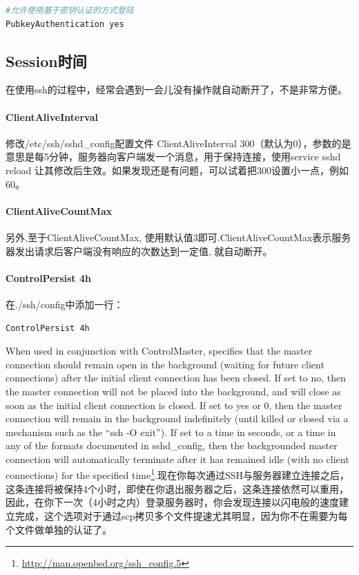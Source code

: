 \documentclass[letter]{book}
\begin{document}
\begin{lstlisting}[language=Bash]
#允许使用基于密钥认证的方式登陆
PubkeyAuthentication yes 
\end{lstlisting}


\subsection{Session时间}

在使用ssh的过程中，经常会遇到一会儿没有操作就自动断开了，不是非常方便。

\paragraph{ClientAliveInterval}

修改/etc/ssh/sshd\_config配置文件 ClientAliveInterval 300（默认为0），参数的是意思是每5分钟，服务器向客户端发一个消息，用于保持连接，使用service sshd reload 让其修改后生效。如果发现还是有问题，可以试着把300设置小一点，例如60。

\paragraph{ClientAliveCountMax}

另外,至于ClientAliveCountMax, 使用默认值3即可.ClientAliveCountMax表示服务器发出请求后客户端没有响应的次数达到一定值, 就自动断开。

\paragraph{ControlPersist 4h}

在./ssh/config中添加一行：

\begin{lstlisting}[language=Bash]
ControlPersist 4h
\end{lstlisting}

When used in conjunction with ControlMaster, specifies that the master connection should remain open in the background (waiting for future client connections) after the initial client connection has been closed. If set to no, then the master connection will not be placed into the background, and will close as soon as the initial client connection is closed. If set to yes or 0, then the master connection will remain in the background indefinitely (until killed or closed via a mechanism such as the “ssh -O exit”). If set to a time in seconds, or a time in any of the formats documented in sshd\_config, then the backgrounded master connection will automatically terminate after it has remained idle (with no client connections) for the specified time\footnote{\url{http://man.openbsd.org/ssh_config.5}}.现在你每次通过SSH与服务器建立连接之后，这条连接将被保持4个小时，即使在你退出服务器之后，这条连接依然可以重用，因此，在你下一次（4小时之内）登录服务器时，你会发现连接以闪电般的速度建立完成，这个选项对于通过scp拷贝多个文件提速尤其明显，因为你不在需要为每个文件做单独的认证了。
\end{document}
